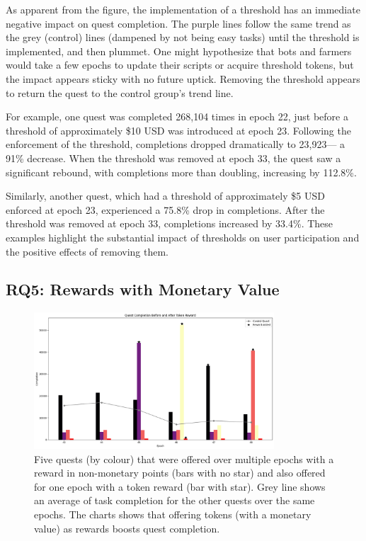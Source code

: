As apparent from the figure, the implementation of a threshold has an immediate negative impact on quest completion. The purple lines follow the same trend as the grey (control) lines (dampened by not being easy tasks) until the threshold is implemented, and then plummet. One might hypothesize that bots and farmers would take a few epochs to update their scripts or acquire threshold tokens, but the impact appears sticky with no future uptick. Removing the threshold appears to return the quest to the control group's trend line.

For example, one quest was completed 268,104 times in epoch 22, just before a threshold of approximately \$10 USD was introduced at epoch 23. Following the enforcement of the threshold, completions dropped dramatically to 23,923— a 91\% decrease. When the threshold was removed at epoch 33, the quest saw a significant rebound, with completions more than doubling, increasing by 112.8\%.

Similarly, another quest, which had a threshold of approximately \$5 USD enforced at epoch 23, experienced a 75.8\% drop in completions. After the threshold was removed at epoch 33, completions increased by 33.4\%. These examples highlight the substantial impact of thresholds on user participation and the positive effects of removing them.



\subsection{RQ5: Rewards with Monetary Value}

\begin{figure}[t]
    \centering
    \includegraphics[width=0.8\textwidth]{figures/tokens.png}
    \caption{Five quests (by colour) that were offered over multiple epochs with a reward in non-monetary points (bars with no star) and also offered for one epoch with a token reward (bar with star). Grey line shows an average of task completion for the other quests over the same epochs. The charts shows that offering tokens (with a monetary value) as rewards boosts quest completion.\label{fig:tokens}}
\end{figure}

